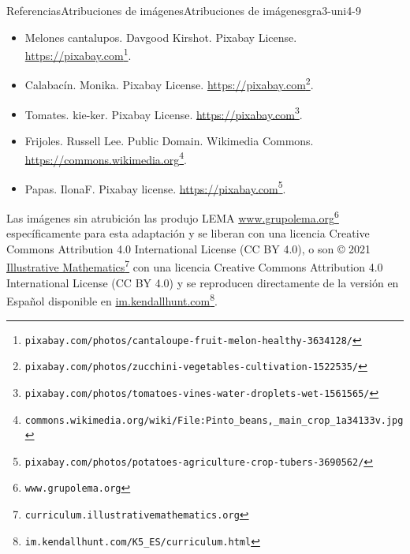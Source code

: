 \begin{references-section}{Referencias}{Atribuciones de imágenes}{}{Atribuciones de imágenes}{}{}{gra3-uni4-9}
\begin{itemize}[label=\textbullet]
\begin{itemize}[label=$\circ$]
\item{}Melones cantalupos. Davgood Kirshot. Pixabay License.\\\href{https://pixabay.com/photos/cantaloupe-fruit-melon-healthy-3634128/}{https:\slash{}\slash{}pixabay.com}\footnote{\nolinkurl{pixabay.com/photos/cantaloupe-fruit-melon-healthy-3634128/}\label{gra3-uni4-9-2-9-2-2-1-2}}.%
\item{}Calabacín. Monika. Pixabay License. \href{https://pixabay.com/photos/zucchini-vegetables-cultivation-1522535/}{https:\slash{}\slash{}pixabay.com}\footnote{\nolinkurl{pixabay.com/photos/zucchini-vegetables-cultivation-1522535/}\label{gra3-uni4-9-2-9-2-3-1-2}}.%
\item{}Tomates. kie-ker. Pixabay License. \href{https://pixabay.com/photos/tomatoes-vines-water-droplets-wet-1561565/}{https:\slash{}\slash{}pixabay.com}\footnote{\nolinkurl{pixabay.com/photos/tomatoes-vines-water-droplets-wet-1561565/}\label{gra3-uni4-9-2-9-2-4-1-2}}.%
\item{}Frijoles. Russell Lee. Public Domain. Wikimedia Commons. \href{https://commons.wikimedia.org/wiki/File:Pinto_beans,_main_crop_1a34133v.jpg}{https:\slash{}\slash{}commons.wikimedia.org}\footnote{\nolinkurl{commons.wikimedia.org/wiki/File:Pinto_beans,_main_crop_1a34133v.jpg}\label{gra3-uni4-9-2-9-2-5-1-2}}.%
\item{}Papas. IlonaF. Pixabay license. \href{https://pixabay.com/photos/potatoes-agriculture-crop-tubers-3690562/}{https:\slash{}\slash{}pixabay.com}\footnote{\nolinkurl{pixabay.com/photos/potatoes-agriculture-crop-tubers-3690562/}\label{gra3-uni4-9-2-9-2-6-1-2}}.%
\end{itemize}
\end{itemize}
Las imágenes sin atrubición las produjo LEMA \href{https://www.grupolema.org}{www.grupolema.org}\footnote{\nolinkurl{www.grupolema.org}\label{gra3-uni4-9-3-2}} específicamente para esta adaptación y se liberan con una licencia Creative Commons Attribution 4.0 International License (CC BY 4.0), o son © 2021 \href{https://curriculum.illustrativemathematics.org}{Illustrative Mathematics}\footnote{\nolinkurl{curriculum.illustrativemathematics.org}\label{gra3-uni4-9-3-4}} con una licencia Creative Commons Attribution 4.0 International License (CC BY 4.0) y se reproducen directamente de la versión en Español disponible en \href{https://im.kendallhunt.com/K5_ES/curriculum.html}{im.kendallhunt.com}\footnote{\nolinkurl{im.kendallhunt.com/K5_ES/curriculum.html}\label{gra3-uni4-9-3-6}}.%
\end{references-section}
\cleardoublepage

